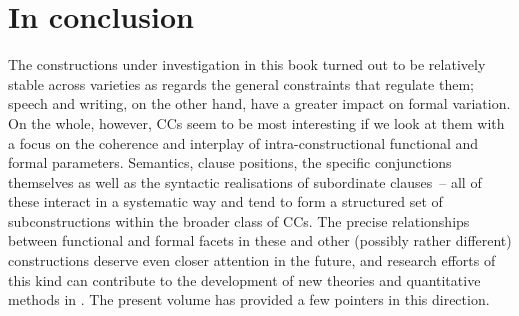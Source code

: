 \section{\label{bkm:Ref82929985}In conclusion}\label{sec:12.4}

The constructions under investigation in this book turned out to be relatively stable across varieties as regards the general constraints that regulate them; speech and writing, on the other hand, have a greater impact on formal variation. On the whole, however, CCs seem to be most interesting if we look at them with a focus on the coherence and interplay of intra-constructional functional and formal parameters. Semantics, clause positions, the specific conjunctions themselves as well as the syntactic realisations of subordinate clauses~– all of these interact in a systematic way and tend to form a structured set of subconstructions within the broader class of CCs. The precise relationships between functional and formal facets in these and other (possibly rather different) constructions deserve even closer attention in the future, and research efforts of this kind can contribute to the development of new theories and quantitative methods in . The present volume has provided a few pointers in this direction.

